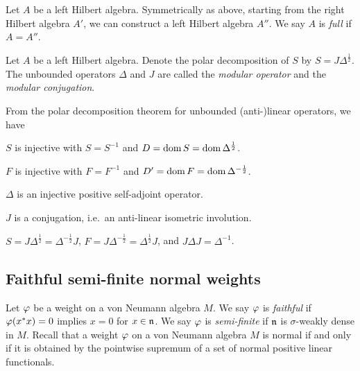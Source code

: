 \documentclass{../../../small}
\begin{document}
\begin{defn}
Let $A$ be a left Hilbert algebra.
Symmetrically as above, starting from the right Hilbert algebra $A'$, we can construct a left Hilbert algebra $A''$.
We say $A$ is \emph{full} if $A=A''$.
\end{defn}


\begin{defn}
Let $A$ be a left Hilbert algebra.
Denote the polar decomposition of $S$ by $S=J\Delta^{\frac12}$.
The unbounded operators $\Delta$ and $J$ are called the \emph{modular operator} and the \emph{modular conjugation}.
\end{defn}

\begin{cor}
From the polar decomposition theorem for unbounded (anti-)linear operators, we have
\begin{parts}
\item $S$ is injective with $S=S^{-1}$ and $D=\operatorname{dom} S=\operatorname{dom}\Delta^{\frac12}$.
\item $F$ is injective with $F=F^{-1}$ and $D'=\operatorname{dom} F=\operatorname{dom}\Delta^{-\frac12}$.
\item $\Delta$ is an injective positive self-adjoint operator.
\item $J$ is a conjugation, i.e.~an anti-linear isometric involution.
\item $S=J\Delta^{\frac12}=\Delta^{-\frac12}J$, $F=J\Delta^{-\frac12}=\Delta^{\frac12}J$, and $J\Delta J=\Delta^{-1}$.
\end{parts}
\end{cor}





\subsection{Faithful semi-finite normal weights}

\begin{defn}
Let $\varphi$ be a weight on a von Neumann algebra $M$.
We say $\varphi$ is \emph{faithful} if $\varphi(x^*x)=0$ implies $x=0$ for $x\in\mathfrak{n}$.
We say $\varphi$ is \emph{semi-finite} if $\mathfrak{n}$ is $\sigma$-weakly dense in $M$.
Recall that a weight $\varphi$ on a von Neumann algebra $M$ is normal if and only if it is obtained by the pointwise supremum of a set of normal positive linear functionals.
\end{defn}
\end{document}

